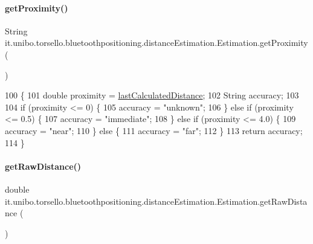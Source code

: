 \paragraph{\texorpdfstring{get\+Proximity()}{getProximity()}}
{\footnotesize\ttfamily String it.\+unibo.\+torsello.\+bluetoothpositioning.\+distance\+Estimation.\+Estimation.\+get\+Proximity (\begin{DoxyParamCaption}{ }\end{DoxyParamCaption})}


\begin{DoxyCode}
100                                  \{
101         \textcolor{keywordtype}{double} proximity = \hyperlink{classit_1_1unibo_1_1torsello_1_1bluetoothpositioning_1_1distanceEstimation_1_1Estimation_a98033672a7c282ab3ada06ada3501f09_a98033672a7c282ab3ada06ada3501f09}{lastCalculatedDistance};
102         String accuracy;
103 
104         \textcolor{keywordflow}{if} (proximity <= 0) \{
105             accuracy = \textcolor{stringliteral}{"unknown"};
106         \} \textcolor{keywordflow}{else} \textcolor{keywordflow}{if} (proximity <= 0.5) \{
107             accuracy = \textcolor{stringliteral}{"immediate"};
108         \} \textcolor{keywordflow}{else} \textcolor{keywordflow}{if} (proximity <= 4.0) \{
109             accuracy = \textcolor{stringliteral}{"near"};
110         \} \textcolor{keywordflow}{else} \{
111             accuracy = \textcolor{stringliteral}{"far"};
112         \}
113         \textcolor{keywordflow}{return} accuracy;
114     \}
\end{DoxyCode}
\hypertarget{classit_1_1unibo_1_1torsello_1_1bluetoothpositioning_1_1distanceEstimation_1_1Estimation_ad355b2e850a8d6013ef771eecd740e1b_ad355b2e850a8d6013ef771eecd740e1b}{}\label{classit_1_1unibo_1_1torsello_1_1bluetoothpositioning_1_1distanceEstimation_1_1Estimation_ad355b2e850a8d6013ef771eecd740e1b_ad355b2e850a8d6013ef771eecd740e1b} 
\paragraph{\texorpdfstring{get\+Raw\+Distance()}{getRawDistance()}}
{\footnotesize\ttfamily double it.\+unibo.\+torsello.\+bluetoothpositioning.\+distance\+Estimation.\+Estimation.\+get\+Raw\+Distance (\begin{DoxyParamCaption}{ }\end{DoxyParamCaption})}


